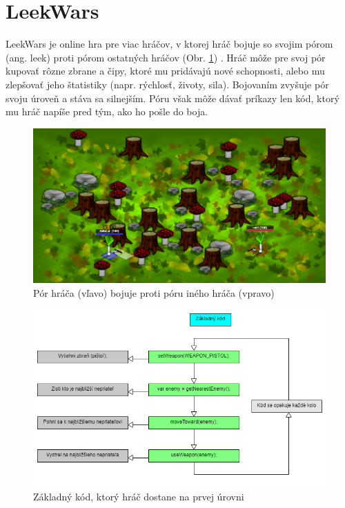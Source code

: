 \documentclass[slovak,a4paper,10pt]{article}
\begin{document}
\section{LeekWars}
LeekWars je online hra pre viac hráčov, v ktorej hráč bojuje so svojim pórom (ang. leek) proti pórom ostatných hráčov (Obr. \ref{fig:obr4}) \cite{combefis2016learning}. Hráč môže pre svoj pór kupovať rôzne zbrane a čipy, ktoré mu pridávajú nové schopnosti, alebo mu zlepšovať jeho štatistiky (napr. rýchlosť, životy, sila). Bojovaním zvyšuje pór svoju úroveň a stáva sa silnejším. Póru však môže dávať príkazy len kód, ktorý mu hráč napíše pred tým, ako ho pošle do boja.
\begin{figure}[h]
\includegraphics[scale=0.3]{leekwarsmain}
\centering
\caption{Pór hráča (vľavo) bojuje proti póru iného hráča (vpravo)}
\label{fig:obr4}
\end{figure}
\begin{figure}[h]
\includegraphics[scale=0.4]{leekwarscode}
\centering
\caption{Základný kód, ktorý hráč dostane na prvej úrovni}
\label{fig:obr5}
\end{figure}
\end{document}
